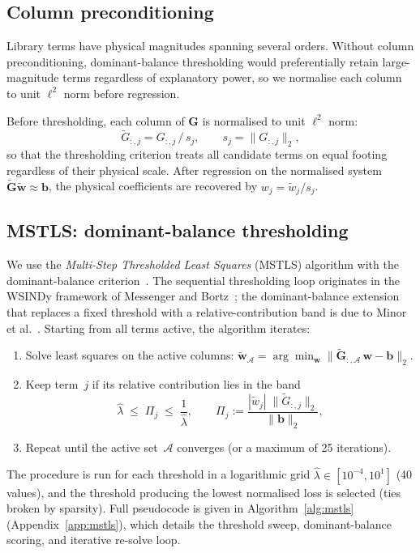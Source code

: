 \subsection{Column preconditioning}
\label{subsec:precondition}

Library terms have physical magnitudes spanning several orders.
Without column preconditioning, dominant-balance thresholding would
preferentially retain large-magnitude terms regardless of explanatory
power, so we normalise each column to unit $\ell^2$ norm before
regression.

Before thresholding, each column of $\mathbf{G}$ is normalised to unit
$\ell^2$ norm:
\begin{equation}
  \tilde{G}_{:,j} = G_{:,j}\,/\,s_j,
  \qquad
  s_j = \lVert G_{:,j}\rVert_2,
  \label{eq:precondition}
\end{equation}
so that the thresholding criterion treats all candidate terms on equal
footing regardless of their physical scale.  After regression on the
normalised system $\tilde{\mathbf{G}}\tilde{\mathbf{w}}\approx\mathbf{b}$,
the physical coefficients are recovered by $w_j = \tilde{w}_j/s_j$.

\subsection{MSTLS: dominant-balance thresholding}
\label{subsec:mstls}

We use the \emph{Multi-Step Thresholded Least Squares} (MSTLS) algorithm
with the dominant-balance criterion~\cite{callaham2021dominant}.
The sequential thresholding loop originates in the WSINDy framework of
Messenger and Bortz~\cite{messenger2021wsindy}; the dominant-balance
extension that replaces a fixed threshold with a relative-contribution
band is due to Minor et al.~\cite{minor2025mstls}.
Starting from all terms active, the algorithm iterates:
\begin{enumerate}[nosep]
\item Solve least squares on the active columns:
      $\tilde{\mathbf{w}}_{\mathcal{A}}
       = \arg\min_{\mathbf{w}}
         \lVert\tilde{\mathbf{G}}_{:,\mathcal{A}}\,\mathbf{w}
               -\mathbf{b}\rVert_2$.
\item Keep term~$j$ if its relative contribution lies in the band
      \begin{equation}
        \hat\lambda
        \;\le\;
        \Pi_j
        \;\le\;
        \frac{1}{\hat\lambda},
        \qquad
        \Pi_j := \frac{|\tilde{w}_j|\;\lVert\tilde{G}_{:,j}\rVert_2}
                      {\lVert\mathbf{b}\rVert_2},
        \label{eq:dominant_balance}
      \end{equation}
\item Repeat until the active set~$\mathcal{A}$ converges
      (or a maximum of 25 iterations).
\end{enumerate}
The procedure is run for each threshold in a logarithmic grid
$\hat\lambda\in[10^{-4},10^1]$ (40 values), and the threshold
producing the lowest normalised loss is selected (ties broken
by sparsity).  Full pseudocode is given in
Algorithm~\ref{alg:mstls} (Appendix~\ref{app:mstls}), which details
the threshold sweep, dominant-balance scoring, and iterative
re-solve loop.

